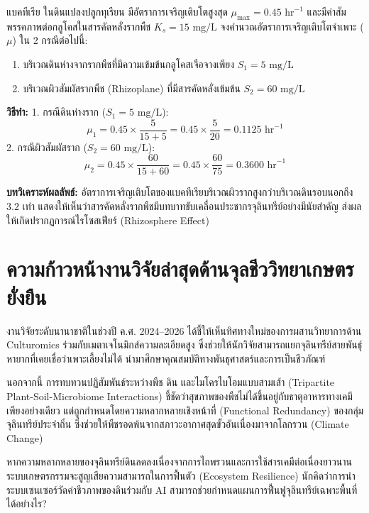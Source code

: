 \begin{worked}
แบคทีเรีย  ในดินแปลงปลูกทุเรียน มีอัตราการเจริญเติบโตสูงสุด $\mu_{\max} = 0.45\text{ hr}^{-1}$ และมีค่าสัมพรรคภาพต่อกลูโคสในสารคัดหลั่งรากพืช $K_s = 15\text{ mg/L}$ 
จงคำนวณอัตราการเจริญเติบโตจำเพาะ ($\mu$) ใน 2 กรณีต่อไปนี้:
\begin{enumerate}
    \item บริเวณดินห่างจากรากพืชที่มีความเข้มข้นกลูโคสเจือจางเพียง $S_1 = 5\text{ mg/L}$
    \item บริเวณผิวสัมผัสรากพืช (Rhizoplane) ที่มีสารคัดหลั่งเข้มข้น $S_2 = 60\text{ mg/L}$
\end{enumerate}

\textbf{วิธีทำ:}
1. กรณีดินห่างราก ($S_1 = 5\text{ mg/L}$):
$$\mu_1 = 0.45 \times \frac{5}{15 + 5} = 0.45 \times \frac{5}{20} = 0.1125\text{ hr}^{-1}$$
2. กรณีผิวสัมผัสราก ($S_2 = 60\text{ mg/L}$):
$$\mu_2 = 0.45 \times \frac{60}{15 + 60} = 0.45 \times \frac{60}{75} = 0.3600\text{ hr}^{-1}$$

\textbf{บทวิเคราะห์ผลลัพธ์:} อัตราการเจริญเติบโตของแบคทีเรียบริเวณผิวรากสูงกว่าบริเวณดินรอบนอกถึง $3.2$ เท่า แสดงให้เห็นว่าสารคัดหลั่งรากพืชมีบทบาทขับเคลื่อนประชากรจุลินทรีย์อย่างมีนัยสำคัญ ส่งผลให้เกิดปรากฏการณ์ไรโซสเฟียร์ (Rhizosphere Effect)
\end{worked}

\section{ความก้าวหน้างานวิจัยล่าสุดด้านจุลชีววิทยาเกษตรยั่งยืน}

งานวิจัยระดับนานาชาติในช่วงปี ค.ศ. 2024–2026 ได้ชี้ให้เห็นทิศทางใหม่ของการผสานวิทยาการด้าน Culturomics ร่วมกับเมตาเจโนมิกส์ความละเอียดสูง \cite{pmid39526137} ซึ่งช่วยให้นักวิจัยสามารถแยกจุลินทรีย์สายพันธุ์หายากที่เคยเชื่อว่าเพาะเลี้ยงไม่ได้ นำมาศึกษาคุณสมบัติทางพันธุศาสตร์และการเป็นชีวภัณฑ์

นอกจากนี้ การทบทวนปฏิสัมพันธ์ระหว่างพืช ดิน และไมโครไบโอมแบบสามเส้า (Tripartite Plant-Soil-Microbiome Interactions) \cite{pmid41800415} ชี้ชัดว่าสุขภาพของพืชไม่ได้ขึ้นอยู่กับธาตุอาหารทางเคมีเพียงอย่างเดียว แต่ถูกกำหนดโดยความหลากหลายเชิงหน้าที่ (Functional Redundancy) ของกลุ่มจุลินทรีย์ประจำถิ่น ซึ่งช่วยให้พืชรอดพ้นจากสภาวะอากาศสุดขั้วอันเนื่องมาจากโลกรวน (Climate Change)

\begin{insight}
หากความหลากหลายของจุลินทรีย์ดินลดลงเนื่องจากการไถพรวนและการใช้สารเคมีต่อเนื่องยาวนาน ระบบเกษตรกรรมจะสูญเสียความสามารถในการฟื้นตัว (Ecosystem Resilience) นักคิดว่าการนำระบบเซนเซอร์วัดค่าชีวภาพของดินร่วมกับ AI สามารถช่วยกำหนดแผนการฟื้นฟูจุลินทรีย์เฉพาะพื้นที่ได้อย่างไร?
\end{insight}

